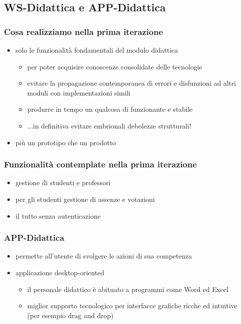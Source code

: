 \subsection{WS-Didattica e APP-Didattica}

\begin{frame}
\frametitle{Cosa realizziamo nella prima iterazione}

\begin{itemize}
\item solo le funzionalità fondamentali del modulo didattica
\begin{itemize}
\item per poter acquisire conoscenze consolidate delle tecnologie
\item evitare la propagazione contemporanea di errori e disfunzioni ad altri moduli con implementazioni simili
\item produrre in tempo un qualcosa di funzionante e stabile
\item ...in definitiva \alert{evitare embrionali debolezze strutturali!}
\end{itemize}

\item più un prototipo che un prodotto
\end{itemize}
\end{frame}

\begin{frame}
\frametitle{Funzionalità contemplate nella prima iterazione}

\begin{itemize}
\item gestione di studenti e professori
\item per gli studenti gestione di assenze e votazioni
\item il tutto senza autenticazione
\end{itemize}

\end{frame}

\begin{frame}
\frametitle{APP-Didattica}

\begin{itemize}
\item permette all'utente di svolgere le azioni di sua competenza
\item applicazione desktop-oriented
\begin{itemize}
\item il personale didattico è abituato a programmi come Word ed Excel
\item miglior supporto tecnologico per interfacce grafiche ricche ed intuitive (per esempio drag and drop)
\end{itemize}

\end{itemize}

\end{frame}

